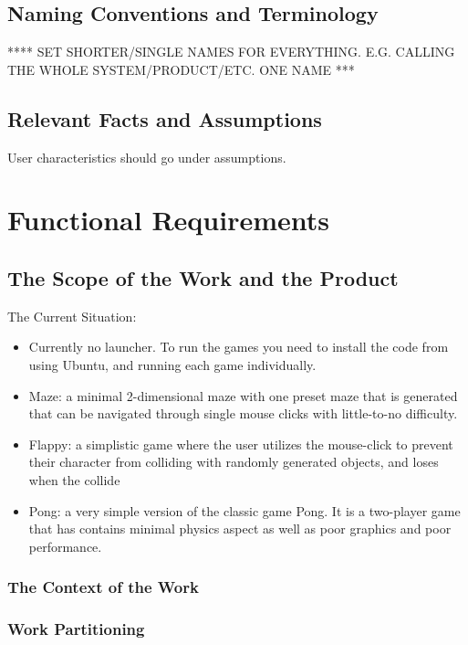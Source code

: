 \documentclass[12pt, titlepage]{article}
\begin{document}
\subsection{Naming Conventions and Terminology}

**** SET SHORTER/SINGLE NAMES FOR EVERYTHING. E.G. CALLING THE WHOLE SYSTEM/PRODUCT/ETC. ONE NAME ***

\subsection{Relevant Facts and Assumptions}

User characteristics should go under assumptions.

\section{Functional Requirements}

\subsection{The Scope of the Work and the Product}

The Current Situation:

\begin{itemize}
    \item Currently no launcher. To run the games you need to install the code from using Ubuntu, and running each game individually.
    \item Maze: a minimal 2-dimensional maze with one preset maze that is generated that can be navigated through single mouse clicks with little-to-no difficulty.
    \item Flappy: a simplistic game where the user utilizes the mouse-click to prevent their character from colliding with randomly generated objects, and loses when the collide
    \item Pong: a very simple version of the classic game Pong. It is a two-player game that has contains minimal physics aspect as well as poor graphics and poor performance.
\end{itemize}

\subsubsection{The Context of the Work}

\subsubsection{Work Partitioning}
\end{document}
